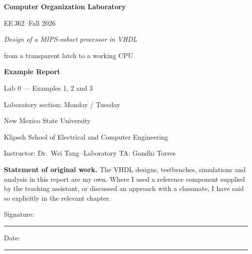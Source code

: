 
\newcommand{\studentname}{Example Report}
\newcommand{\studentid}{Lab 0 --- Examples 1, 2 and 3}
\newcommand{\labsection}{Monday / Tuesday}      %

\begin{titlepage}
\centering
\vspace*{2.5cm}

{\Huge\bfseries Computer Organization Laboratory\par}
\vspace{6pt}
{\Large EE\,362 \quad$\cdot$\quad Fall 2026\par}

\vspace{1.2cm}
{\large\itshape Design of a MIPS-subset processor in VHDL\par}
\vspace{4pt}
{\normalsize from a transparent latch to a working CPU\par}

\vspace{2.4cm}
{\Large\bfseries \studentname\par}
\vspace{4pt}
{\large \studentid\par}
\vspace{10pt}
{\large Laboratory section: \labsection\par}

\vspace{2.4cm}
{\normalsize New Mexico State University\par}
{\normalsize Klipsch School of Electrical and Computer Engineering\par}
\vspace{6pt}
{\normalsize Instructor: Dr.~Wei Tang \quad$\cdot$\quad Laboratory TA: Gandhi Torres\par}

\vfill
{\small\textbf{Statement of original work.}\; The VHDL designs, testbenches,
simulations and analysis in this report are my own. Where I used a reference
component supplied by the teaching assistant, or discussed an approach with a
classmate, I have said so explicitly in the relevant chapter.\par}
\vspace{10pt}
{\small Signature: \rule{6cm}{0.4pt} \hfill Date: \rule{3.5cm}{0.4pt}\par}

\end{titlepage}
